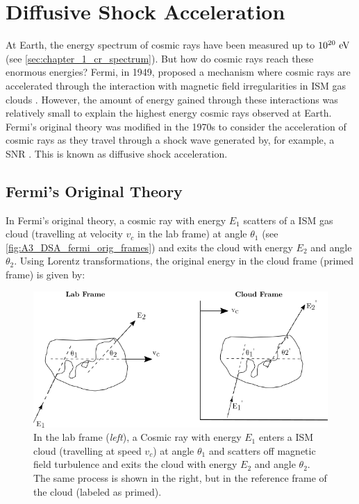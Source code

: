 \chapter{Diffusive Shock Acceleration} \label{A3_DSA}

At Earth, the energy spectrum of cosmic rays have been measured up to $10^{20}~\si{\electronvolt}$ (see \autoref{sec:chapter_1_cr_spectrum}). But how do cosmic rays reach these enormous energies? Fermi, in 1949, proposed a mechanism where cosmic rays are accelerated through the interaction with magnetic field irregularities in ISM gas clouds \citep{1949PhRv...75.1169F}. However, the amount of energy gained through these interactions was relatively small to explain the highest energy cosmic rays observed at Earth. Fermi's original theory was modified in the 1970s to consider the acceleration of cosmic rays as they travel through a shock wave generated by, for example, a SNR \citep{1977DoSSR.234.1306K,1977ICRC...11..132A,1978MNRAS.182..147B,1978MNRAS.182..443B,1978ApJ...221L..29B}. This is known as diffusive shock acceleration.

\section{Fermi's Original Theory}

In Fermi's original theory, a cosmic ray with energy $E_1$  scatters of a ISM gas cloud (travelling at velocity $v_c$ in the lab frame) at angle $\theta_1$ (see \autoref{fig:A3_DSA_fermi_orig_frames}) and exits the cloud with energy $E_2$ and angle $\theta_2$. Using Lorentz transformations, the original energy in the cloud frame (primed frame) is given by:

\begin{figure}[h!]
    \centering
    \includegraphics{A3_Diffusive_Shock_Acceleration/Images/fermi_original_theory_frames.png}
    \caption{In the lab frame (\textit{left}), a Cosmic ray with energy $E_1$ enters a ISM cloud (travelling at speed $v_c$) at angle $\theta_1$ and scatters off magnetic field turbulence and exits the cloud with energy $E_2$ and angle $\theta_2$. The same process is shown in the right, but in the reference frame of the cloud (labeled as primed).}
    \label{fig:A3_DSA_fermi_orig_frames}
\end{figure}

